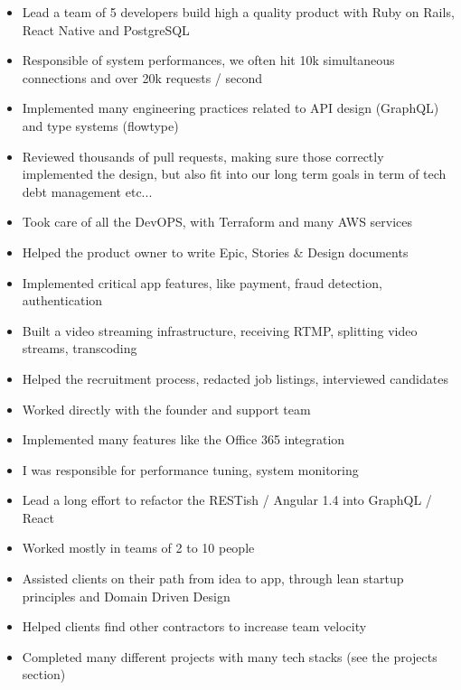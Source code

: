 \documentclass[10pt,a4paper,ragged2e,withhyper]{altacv}
\begin{document}
\begin{paracol}{2}


  \begin{itemize}
    \item Lead a team of 5 developers build high a quality product with Ruby on Rails, React Native and PostgreSQL
    \item Responsible of system performances, we often hit 10k simultaneous connections and over 20k requests / second
    \item Implemented many engineering practices related to API design (GraphQL) and type systems (flowtype)
    \item Reviewed thousands of pull requests, making sure those correctly implemented the design,
          but also fit into our long term goals in term of tech debt management etc...
    \item Took care of all the DevOPS, with Terraform and many AWS services
    \item Helped the product owner to write Epic, Stories \& Design documents
    \item Implemented critical app features, like payment, fraud detection, authentication
    \item Built a video streaming infrastructure, receiving RTMP, splitting video streams, transcoding
    \item Helped the recruitment process, redacted job listings, interviewed candidates
  \end{itemize}

  \divider

  \begin{itemize}
    \item Worked directly with the founder and support team
    \item Implemented many features like the Office 365 integration
    \item I was responsible for performance tuning, system monitoring
    \item Lead a long effort to refactor the RESTish / Angular 1.4 into GraphQL / React
  \end{itemize}

  \divider

  \begin{itemize}
    \item Worked mostly in teams of 2 to 10 people
    \item Assisted clients on their path from idea to app, through lean startup principles and Domain Driven Design
    \item Helped clients find other contractors to increase team velocity
    \item Completed many different projects with many tech stacks (see the projects section)
  \end{itemize}


\end{paracol}
\end{document}
